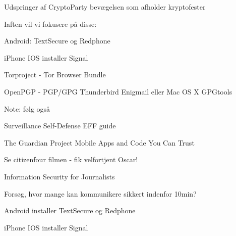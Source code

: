 \documentclass[20pt,landscape,a4paper,footrule]{foils}
\begin{document}

Udspringer af CryptoParty bevægelsen som afholder kryptofester\\

Iaften vil vi fokusere på disse:
\begin{list2}
\item Android: TextSecure og Redphone
\item iPhone IOS installer Signal
\item Torproject - Tor Browser Bundle
\item OpenPGP - PGP/GPG Thunderbird Enigmail eller  Mac OS X GPGtools
\end{list2}

Note: følg også 


\begin{list2}
\item Surveillance Self-Defense EFF guide
\item The Guardian Project Mobile Apps and Code You Can Trust\\
\item Se citizenfour filmen - fik velfortjent Oscar!\\ {\footnotesize{}}
\item Information Security for Journalists\\
\end{list2}





Forsøg, hvor mange kan kommunikere sikkert indenfor 10min?

\begin{list2}
\item Android installer TextSecure og Redphone
\item iPhone IOS installer Signal
\end{list2}
\end{document}
